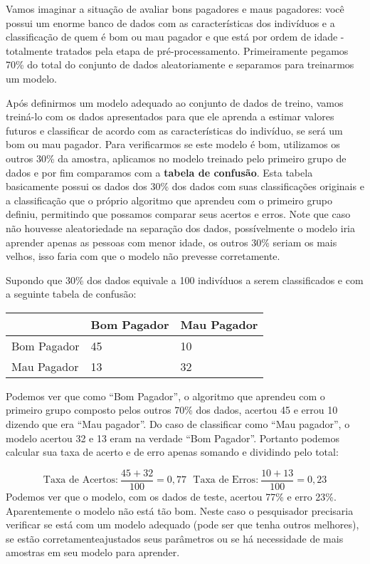 \documentclass[
  openany]{book}
\begin{document}
Vamos imaginar a situação de avaliar bons pagadores e maus pagadores: você possui um enorme banco de dados com as características dos indivíduos e a classificação de quem é bom ou mau pagador e que está por ordem de idade - totalmente tratados pela etapa de pré-processamento. Primeiramente pegamos 70\% do total do conjunto de dados aleatoriamente e separamos para treinarmos um modelo.

Após definirmos um modelo adequado ao conjunto de dados de treino, vamos treiná-lo com os dados apresentados para que ele aprenda a estimar valores futuros e classificar de acordo com as características do indivíduo, se será um bom ou mau pagador. Para verificarmos se este modelo é bom, utilizamos os outros 30\% da amostra, aplicamos no modelo treinado pelo primeiro grupo de dados e por fim comparamos com a \textbf{tabela de confusão}. Esta tabela basicamente possui os dados dos 30\% dos dados com suas classificações originais e a classificação que o próprio algoritmo que aprendeu com o primeiro grupo definiu, permitindo que possamos comparar seus acertos e erros. Note que caso não houvesse aleatoriedade na separação dos dados, possívelmente o modelo iria aprender apenas as pessoas com menor idade, os outros 30\% seriam os mais velhos, isso faria com que o modelo não prevesse corretamente.

Supondo que 30\% dos dados equivale a 100 indivíduos a serem classificados e com a seguinte tabela de confusão:

\begin{longtable}[]{@{}lll@{}}
\toprule
& Bom Pagador & Mau Pagador\tabularnewline
\midrule
\endhead
Bom Pagador & 45 & 10\tabularnewline
Mau Pagador & 13 & 32\tabularnewline
\bottomrule
\end{longtable}

Podemos ver que como ``Bom Pagador'', o algoritmo que aprendeu com o primeiro grupo composto pelos outros 70\% dos dados, acertou 45 e errou 10 dizendo que era ``Mau pagador''. Do caso de classificar como ``Mau pagador'', o modelo acertou 32 e 13 eram na verdade ``Bom Pagador''. Portanto podemos calcular sua taxa de acerto e de erro apenas somando e dividindo pelo total:

\[\mbox{Taxa de Acertos:}\ \frac{45+32}{100}=0,77 \ \ \ \mbox{Taxa de Erros:}\ \frac{10+13}{100}=0,23\]
Podemos ver que o modelo, com os dados de teste, acertou 77\% e erro 23\%. Aparentemente o modelo não está tão bom. Neste caso o pesquisador precisaria verificar se está com um modelo adequado (pode ser que tenha outros melhores), se estão corretamenteajustados seus parâmetros ou se há necessidade de mais amostras em seu modelo para aprender.
\end{document}
